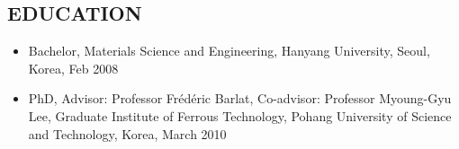 \documentclass{res}
\begin{document}

\address{\bf Center for Automotive Lightweighting \\
  \bf National Institute of Standards and Technology \\
  \bf US Department of Commerce \\
  \bf 100 Bureau Drive Stop 8553, \\
  \bf Gaithersburg, MD, US \\
  \bf zip: 20899-8553
  \bf +1 (301) 975-5028,  youngung.jeong@nist.gov}

\begin{resume}
  \section{EDUCATION}
  \begin{itemize}
  \item Bachelor, Materials Science and Engineering, Hanyang University, Seoul, Korea, Feb 2008
  \item PhD, Advisor: Professor Fr\'ed\'eric Barlat, Co-advisor: Professor Myoung-Gyu Lee, Graduate Institute of Ferrous Technology, Pohang University of Science and Technology, Korea, March 2010
  \end{itemize}


\end{resume}
\end{document}
